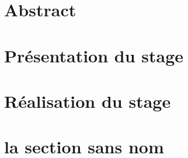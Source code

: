 \documentclass[a4paper,oneside,11pt]{article}
\begin{document}
%


\section{Abstract}



\section{Présentation du stage}



\section{Réalisation du stage}


\section{la section sans nom}



%
\end{document}
